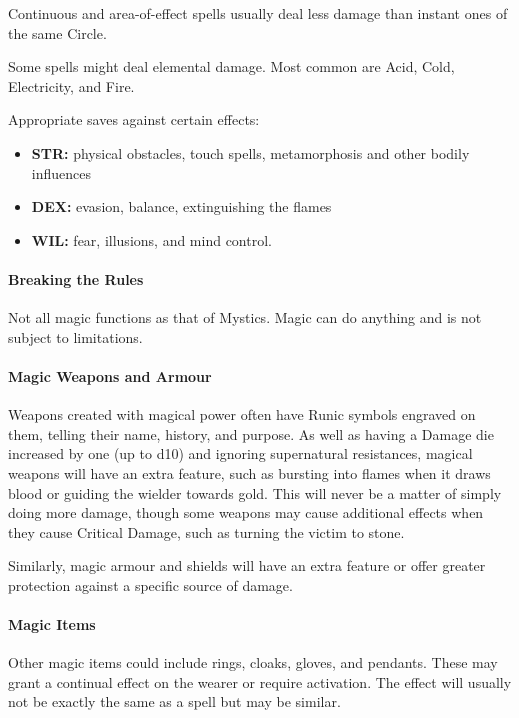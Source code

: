 \documentclass[itdr]{subfiles}
\begin{document}
Continuous and area-of-effect spells usually deal less damage than instant ones of the same Circle.

Some spells might deal elemental damage. Most common are Acid, Cold, Electricity, and Fire.

Appropriate saves against certain effects:
\begin{itemize}
	\item \textbf{STR:} physical obstacles, touch spells, metamorphosis and other bodily influences
	\item \textbf{DEX:} evasion, balance, extinguishing the flames
	\item \textbf{WIL:} fear, illusions, and mind control.
\end{itemize}

\vfill
\break

\paragraph{Breaking the Rules}
Not all magic functions as that of Mystics. Magic can do anything and is not subject to limitations.

\vfill

\paragraph{Magic Weapons and Armour}
Weapons created with magical power often have Runic symbols engraved on them, telling their name, history, and purpose. As well as having a Damage die increased by one (up to d10) and ignoring supernatural resistances, magical weapons will have an extra feature, such as bursting into flames when it draws blood or guiding the wielder towards gold. This will never be a matter of simply doing more damage, though some weapons may cause additional effects when they cause Critical Damage, such as turning the victim to stone.

Similarly, magic armour and shields will have an extra feature or offer greater protection against a specific source of damage.

\vfill

\paragraph{Magic Items}
Other magic items could include rings, cloaks, gloves, and pendants. These may grant a continual effect on the wearer or require activation. The effect will usually not be exactly the same as a spell but may be similar.
\end{document}
